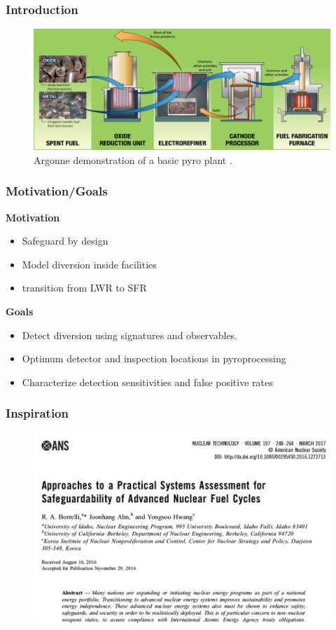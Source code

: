 \begin{frame}
\frametitle{Introduction}
	\begin{figure}
		\centering
		\includegraphics[width=\linewidth]{pyro-background.png}
		\caption{Argonne demonstration of a basic pyro plant \cite{williamson_pyroprocessing_nodate}.}
		\label{fig:pyro}
	\end{figure}
\end{frame}

\begin{frame}
\frametitle{Motivation/Goals}
\textbf{Motivation}
\begin{itemize}
	\item Safeguard by design
	\item Model diversion inside facilities
	\item transition from LWR to SFR
\end{itemize}
\textbf{Goals}
\begin{itemize}
	\item Detect diversion using signatures and observables.
	\item Optimum detector and inspection locations in pyroprocessing
	\item Characterize detection sensitivities and false positive rates
\end{itemize}
\end{frame}


\begin{frame}
\frametitle{Inspiration}
\begin{figure}
\centering
\includegraphics[width=0.9\linewidth]{borrelli-citation.png}
\end{figure}
\end{frame}